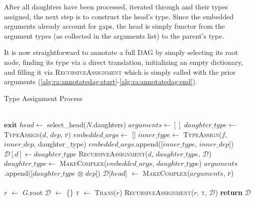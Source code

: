 After all daughters have been processed, iterated through and their types assigned, the next step is to construct the head's type.
Since the embedded arguments already account for gaps, the head is simply functor from the argument types (as collected in the arguments list) to the parent's type.

It is now straightforward to annotate a full DAG by simply selecting its root node, finding its type via a direct translation, initializing an empty dictionary, and filling it via \textsc{RecursiveAssignment} which is simply called with the prior arguments (\ref{alg:ra:annotatedag:start}-\ref{alg:ra:annotatedag:end}).

\begin{algorithm}{
\caption{Type Assignment Process}\label{alg:ra}
\begin{algorithmic}[1]
\\
\label{alg:ra:recursiveassignment:start}
        \State $\textbf{exit}$
    \EndIf
    \State $head \gets$ select\_head($N$.daughters)
    \label{alg:ra:recursiveassignment:select_head}
    \State $arguments \gets []$
        \State $daughter\_type \gets$ \textsc{TypeAssign}($d$, $dep$, \textsc{p})
        \State $embedded\_args \gets$ []
        \label{alg:ra:recursiveassignment:findhot:start}
                \State $inner\_type \gets$ \textsc{TypeAssign}($f$, $inner\_dep$, daughter\_type)
                \State $embedded\_args$.append([$inner\_type$, $inner\_dep$])
            \EndIf
        \EndFor
        \label{alg:ra:recursiveassignment:findhot:end}
            \State $\mathcal{D}[d] \gets daughter\_type$
            \State \textsc{RecursiveAssignment}($d$, $daughter\_type$, $\mathcal{D}$)
        \EndIf
        \State $daughter\_type \gets$ \textsc{MakeComplex}($embedded\_args$, $daughter\_type$)
            \State $arguments$.append([$daughter\_type$ $\otimes$ $dep$])
        \EndIf
    \EndFor
    \State $\mathcal{D}$[$head$] $\gets$ \textsc{MakeComplex}($arguments$, \textsc{p})
\EndProcedure
\label{alg:ra:recursiveassignment:end}
\\
\\
\label{alg:ra:annotatedag:start}
    \State $r$ $\gets$ $G$.root
    \State $\mathcal{D}$ $\gets$ \{\}
    \State \textsc{t} $\gets$ \textsc{Trans}($r$)
    \State \textsc{RecursiveAssignment}($r$, \textsc{t}, $\mathcal{D}$)
    \State \textbf{return} $\mathcal{D}$
\EndProcedure
\label{alg:ra:annotatedag:end}
\end{algorithmic}
}
\end{algorithm}

